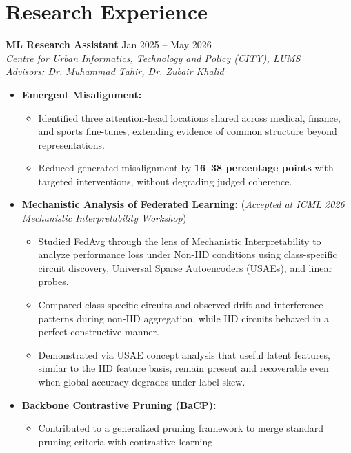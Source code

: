 \documentclass[11pt]{article}
\begin{document}
\section{Research Experience}

\textbf{ML Research Assistant} \hfill Jan 2025 -- May 2026\\
\textit{\href{https://lums.edu.pk/academic-report/ar2024/centre-city.php}{Centre for Urban Informatics, Technology and Policy (CITY)}, LUMS} \\
\textit{Advisors: Dr. Muhammad Tahir, Dr. Zubair Khalid}
\begin{itemize}
    \item \textbf{Emergent Misalignment:}
    \begin{itemize}[label=$\circ$]
        \item Identified three attention-head locations shared across medical, finance, and sports fine-tunes, extending evidence of common structure beyond representations.
        \item Reduced generated misalignment by \textbf{16--38 percentage points} with targeted interventions, without degrading judged coherence.
    \end{itemize}
    \item \textbf{Mechanistic Analysis of Federated Learning:} (\textit{Accepted at ICML 2026 Mechanistic Interpretability Workshop})
    \begin{itemize}[label=$\circ$]
        \item Studied FedAvg through the lens of Mechanistic Interpretability to analyze performance loss under Non-IID conditions using class-specific circuit discovery, Universal Sparse Autoencoders (USAEs), and linear probes.
        \item Compared class-specific circuits and observed drift and interference patterns during non-IID aggregation, while IID circuits behaved in a perfect constructive manner.
        \item Demonstrated via USAE concept analysis that useful latent features, similar to the IID feature basis, remain present and recoverable even when global accuracy degrades under label skew.
    \end{itemize}
    \item \textbf{Backbone Contrastive Pruning (BaCP):}
        \begin{itemize}[label=$\circ$]
            \item Contributed to a generalized pruning framework to merge standard pruning criteria with contrastive learning

\end{itemize}
\end{itemize}
\end{document}
